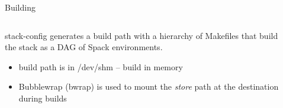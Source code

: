 \documentclass[aspectratio=43]{beamer}
\begin{document}
\begin{frame}[fragile]{Building}
    \begin{columns}[T]
        \begin{column}{0.6\textwidth}
            stack-config generates a build path with a hierarchy of Makefiles that build the stack as a DAG of Spack environments.
            \begin{itemize}
                \item build path is in /dev/shm -- build in memory
                \item Bubblewrap (bwrap) is used to mount the \emph{store} path at the destination during builds
            \end{itemize}
                \hspace{1.5cm}
        \end{column}


        \begin{column}{0.4\textwidth}
            {
            \setlength{\DTbaselineskip}{5pt}
            \footnotesize
            
            }
        \end{column}
    \end{columns}
\end{frame}
\end{document}

